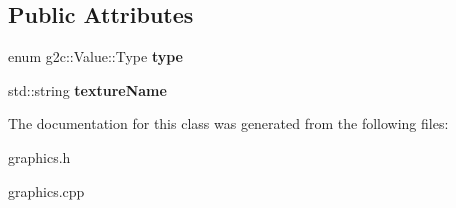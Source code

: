 \subsection*{Public Attributes}
\begin{DoxyCompactItemize}
\item 
\hypertarget{classg2c_1_1_value_adf86b70809fc12705dacbd7b8cdcfb73}{
enum g2c::Value::Type {\bfseries type}}
\label{classg2c_1_1_value_adf86b70809fc12705dacbd7b8cdcfb73}

\item 
\hypertarget{classg2c_1_1_value_ab847b4a4e1d11a628192ec1c1246500e}{
std::string {\bfseries textureName}}
\label{classg2c_1_1_value_ab847b4a4e1d11a628192ec1c1246500e}

\end{DoxyCompactItemize}


The documentation for this class was generated from the following files:\begin{DoxyCompactItemize}
\item 
graphics.h\item 
graphics.cpp\end{DoxyCompactItemize}
